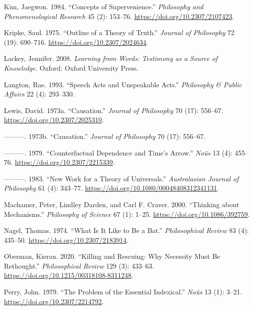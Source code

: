 \documentclass[
  12pt,
  letterpaper,
  DIV=11,
  numbers=noendperiod]{scrartcl}
\newlength{\cslhangindent}
\newenvironment{CSLReferences}[2] %
 {\begin{list}{}{%
  \setlength{\itemindent}{0pt}
  \setlength{\leftmargin}{0pt}
  \setlength{\parsep}{0pt}
  \ifodd #1
   \setlength{\leftmargin}{\cslhangindent}
   \setlength{\itemindent}{-1\cslhangindent}
  \fi
  \setlength{\itemsep}{#2\baselineskip}}}
 {\end{list}}
\begin{document}
\begin{CSLReferences}{1}{0}
Kim, Jaegwon. 1984. {``Concepts of Supervenience.''} \emph{Philosophy
and Phenomenological Research} 45 (2): 153--76.
\url{https://doi.org/10.2307/2107423}.

Kripke, Saul. 1975. {``Outline of a Theory of Truth.''} \emph{Journal of
Philosophy} 72 (19): 690--716. \url{https://doi.org/10.2307/2024634}.

Lackey, Jennifer. 2008. \emph{Learning from Words: Testimony as a Source
of Knowledge}. Oxford: Oxford University Press.

Langton, Rae. 1993. {``Speech Acts and Unspeakable Acts.''}
\emph{Philosophy \& Public Affairs} 22 (4): 293--330.

Lewis, David. 1973a. {``Causation.''} \emph{Journal of Philosophy} 70
(17): 556--67. \url{https://doi.org/10.2307/2025310}.

---------. 1973b. {``Causation.''} \emph{Journal of Philosophy} 70 (17):
556--67.

---------. 1979. {``Counterfactual Dependence and Time's Arrow.''}
\emph{Noûs} 13 (4): 455--76. \url{https://doi.org/10.2307/2215339}.

---------. 1983. {``New Work for a Theory of Universals.''}
\emph{Australasian Journal of Philosophy} 61 (4): 343--77.
\url{https://doi.org/10.1080/00048408312341131}.

Machamer, Peter, Lindley Darden, and Carl F. Craver. 2000. {``Thinking
about Mechanisms.''} \emph{Philosophy of Science} 67 (1): 1--25.
\url{https://doi.org/10.1086/392759}.

Nagel, Thomas. 1974. {``What Is It Like to Be a Bat.''}
\emph{Philosophical Review} 83 (4): 435--50.
\url{https://doi.org/10.2307/2183914}.

Oberman, Kieran. 2020. {``Killing and Rescuing: Why Necessity Must Be
Rethought.''} \emph{Philosophical Review} 129 (3): 433--63.
\url{https://doi.org/10.1215/00318108-8311248}.

Perry, John. 1979. {``The Problem of the Essential Indexical.''}
\emph{Noûs} 13 (1): 3--21. \url{https://doi.org/10.2307/2214792}.


\end{CSLReferences}
\end{document}
